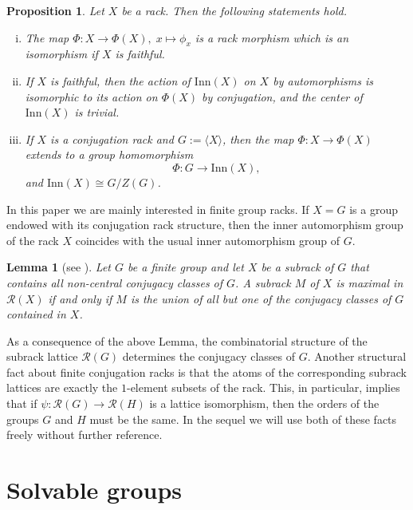 \documentclass[a4paper,12pt]{article}
\newtheorem{lem}[thm]{Lemma}
\newtheorem{prop}[thm]{Proposition}
\theoremstyle{definition}
\theoremstyle{remark}
\begin{document}
\begin{prop}\label{prop:act}
  Let $X$ be a rack. Then the following statements hold.
  \begin{enumerate}[(i)]
  \item The map $\Phi\colon X\to \Phi(X),\; x\mapsto \phi_x$ is a rack morphism which is an isomorphism if $X$ is faithful.
  \item If $X$ is faithful, then the action of $\mathrm{Inn}(X)$ on $X$ by automorphisms is isomorphic to its action on $\Phi(X)$ by conjugation, and the center of $\mathrm{Inn}(X)$ is trivial.
  \item If $X$ is a conjugation rack and $G := \langle X \rangle$, then the map $\Phi\colon X\to \Phi(X)$ extends to a group homomorphism
  $$\Phi\colon G\to \mathrm{Inn}(X),$$
  and $\mathrm{Inn}(X)\cong G/Z(G)$.
  \end{enumerate}
\end{prop}

In this paper we are mainly interested in finite group racks. If $X=G$ is a group endowed with its conjugation rack structure, then the inner automorphism group of the rack $X$ coincides with the usual inner automorphism group of $G$.


\begin{lem}[see {\cite[Lemma~2.8]{HSW19}}]\label{lem:2.8}
  Let $G$ be a finite group and let $X$ be a subrack of $G$ that contains all non-central conjugacy classes of $G$. A subrack $M$ of $X$ is maximal in $\mathcal{R}(X)$ if and only if $M$ is the union of all but one of the conjugacy classes of $G$ contained in $X$.
\end{lem}

As a consequence of the above Lemma, the combinatorial structure of the subrack lattice $\mathcal{R}(G)$ determines the conjugacy classes of $G$. Another structural fact about finite conjugation racks is that the atoms of the corresponding subrack lattices are exactly the $1$-element subsets of the rack. This, in particular, implies that if $\psi\colon \mathcal{R}(G)\to \mathcal{R}(H)$ is a lattice isomorphism, then the orders of the groups $G$ and $H$ must be the same. In the sequel we will use both of these facts freely without further reference.


\section{Solvable groups}\label{sec:sol}
\end{document}
